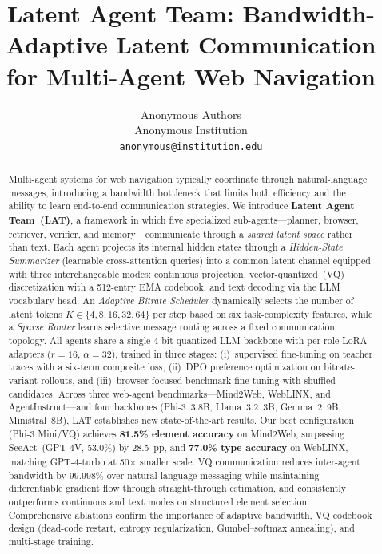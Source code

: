 \documentclass{article}
\title{Latent Agent Team: Bandwidth-Adaptive Latent Communication\\for Multi-Agent Web Navigation}
\author{
  Anonymous Authors \\
  Anonymous Institution \\
  \texttt{anonymous@institution.edu}
}
\newcommand{\ours}{\textsc{LAT}}
\begin{document}
\maketitle

\begin{abstract}
Multi-agent systems for web navigation typically coordinate through natural-language messages, introducing a bandwidth bottleneck that limits both efficiency and the ability to learn end-to-end communication strategies.
We introduce \textbf{Latent Agent Team~(\ours{})}, a framework in which five specialized sub-agents---planner, browser, retriever, verifier, and memory---communicate through a \emph{shared latent space} rather than text.
Each agent projects its internal hidden states through a \emph{Hidden-State Summarizer} (learnable cross-attention queries) into a common latent channel equipped with three interchangeable modes: continuous projection, vector-quantized~(VQ) discretization with a 512-entry EMA codebook, and text decoding via the LLM vocabulary head.
An \emph{Adaptive Bitrate Scheduler} dynamically selects the number of latent tokens $K\!\in\!\{4,8,16,32,64\}$ per step based on six task-complexity features, while a \emph{Sparse Router} learns selective message routing across a fixed communication topology.
All agents share a single 4-bit quantized LLM backbone with per-role LoRA adapters ($r{=}16$, $\alpha{=}32$), trained in three stages: (i)~supervised fine-tuning on teacher traces with a six-term composite loss, (ii)~DPO preference optimization on bitrate-variant rollouts, and (iii)~browser-focused benchmark fine-tuning with shuffled candidates.
Across three web-agent benchmarks---Mind2Web, WebLINX, and AgentInstruct---and four backbones (Phi-3~3.8B, Llama~3.2~3B, Gemma~2~9B, Ministral~8B), \ours{} establishes new state-of-the-art results.
Our best configuration (Phi-3 Mini/VQ) achieves \textbf{81.5\% element accuracy} on Mind2Web, surpassing SeeAct~(GPT-4V, 53.0\%) by 28.5~pp, and \textbf{77.0\% type accuracy} on WebLINX, matching GPT-4-turbo at 50$\times$ smaller scale.
VQ communication reduces inter-agent bandwidth by 99.998\% over natural-language messaging while maintaining differentiable gradient flow through straight-through estimation, and consistently outperforms continuous and text modes on structured element selection.
Comprehensive ablations confirm the importance of adaptive bandwidth, VQ codebook design (dead-code restart, entropy regularization, Gumbel--softmax annealing), and multi-stage training.
\end{abstract}
\end{document}
